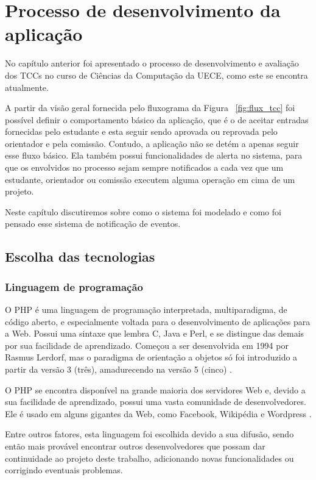 \chapter{Processo de desenvolvimento da aplicação}
\label{cha:desenvolvimento}

No capítulo anterior foi apresentado o processo de desenvolvimento
e avaliação dos TCCs no curso de Ciências da Computação da UECE, como este se 
encontra atualmente. 

A partir da visão geral fornecida pelo fluxograma 
da Figura ~\ref{fig:flux_tcc} foi possível definir o comportamento básico 
da aplicação, que é o de aceitar entradas fornecidas pelo estudante e esta seguir sendo aprovada
ou reprovada pelo orientador e pela comissão. Contudo, a aplicação não se 
detém a apenas seguir esse fluxo básico. Ela também possui funcionalidades
de alerta no sistema, para que os envolvidos no processo sejam sempre 
notificados a cada vez que um estudante, orientador ou comissão executem alguma
operação em cima de um projeto.

Neste capítulo discutiremos sobre como o sistema foi modelado e como foi pensado
esse sistema de notificação de eventos.

\section{Escolha das tecnologias}
\label{tecnologias}
\subsection{Linguagem de programação}
O PHP é uma linguagem de programação interpretada, multiparadigma, de código aberto, e especialmente
voltada para o desenvolvimento de aplicações para a Web. Possui uma sintaxe que lembra
C, Java e Perl, e se distingue das demais por sua facilidade de aprendizado.
Começou a ser desenvolvida em 1994 por Rasmus Lerdorf, mas o paradigma de orientação
a objetos só foi introduzido a partir da versão 3 (três), amadurecendo na versão 5 (cinco) \cite{PHP, Wiki:PHP}.

O PHP se encontra disponível na grande maioria dos servidores Web e, devido a sua 
facilidade de aprendizado, possui uma vasta comunidade de desenvolvedores. Ele é 
usado em alguns gigantes da Web, como Facebook, Wikipédia e Wordpress \cite{InfoQ:Facebook, Wikipedia:Arquitetura, Wordpress}.

Entre outros fatores, esta linguagem foi escolhida devido a sua difusão, sendo então mais
provável encontrar outros desenvolvedores que possam dar continuidade ao projeto deste trabalho,
adicionando novas funcionalidades ou corrigindo eventuais problemas.

